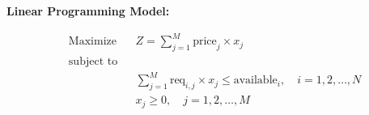 \documentclass{article}
\begin{document}
\textbf{Linear Programming Model:}

\[
\begin{aligned}
    & \text{Maximize} && Z = \sum_{j=1}^{M} \text{price}_j \times x_j \\
    & \text{subject to} \\
    & && \sum_{j=1}^{M} \text{req}_{i,j} \times x_j \leq \text{available}_i, \quad i = 1, 2, \ldots, N \\
    & && x_j \geq 0, \quad j = 1, 2, \ldots, M \\
\end{aligned}
\]
\end{document}
